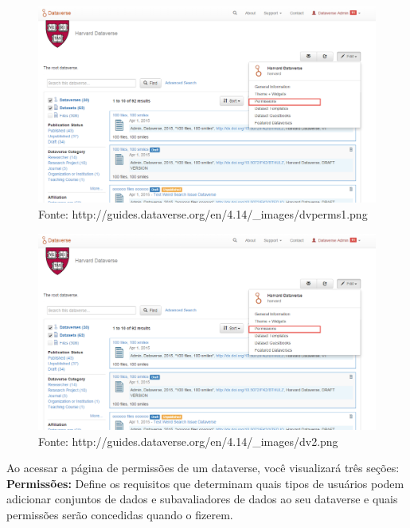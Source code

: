 \documentclass[12pt,hidelinks]{article}
\begin{document}
\newpage

\begin{figure}[H]
\centering
    \includegraphics[width=1.0\textwidth]{prt1.png}
    \caption{Fonte: http://guides.dataverse.org/en/4.14/\_images/dvperms1.png}
    \label{Permissões}
\end{figure}

\begin{figure}
\centering
    \includegraphics[width=1.0\textwidth]{prt1.png}
    \caption{Fonte: http://guides.dataverse.org/en/4.14/\_images/dv2.png}
    \label{Permissões 2}
\end{figure}

Ao acessar a página de permissões de um dataverse, você visualizará três seções:\\

\textbf{Permissões:} Define os requisitos que determinam quais tipos de usuários podem adicionar conjuntos de dados e subavaliadores de dados ao seu dataverse e quais permissões serão concedidas quando o fizerem.\\
\end{document}

